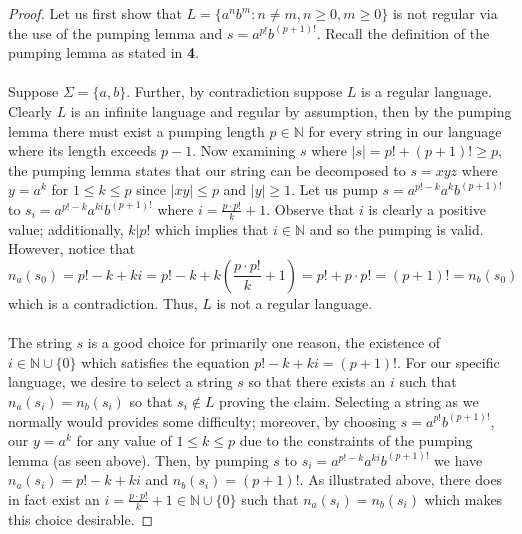 \documentclass[ 12pt ]{article}
\begin{document}
\begin{enumerate}
		\begin{proof}
			Let us first show that $L =  \{ a^n b^m : n \neq m, n \geq 0, m \geq 0 \}$ is not regular via the use of the pumping lemma and $s = a^{p!} b^{(p+1)!}$. Recall the definition
			of the pumping lemma as stated in \textbf{4}. \\ \\
			Suppose $\Sigma = \{ a, b \}$. Further, by contradiction suppose $L$ is a regular language. Clearly $L$ is an infinite language and regular by assumption, then by the pumping
			lemma there must exist a pumping length $p \in \mathbb{N}$ for every string in our language where its length exceeds $p-1$. Now examining $s$ where $|s| = p! + (p+1)! \geq p$,
			the pumping lemma states that our string can be decomposed to $s = xyz$ where $y = a^k$ for $1 \leq k \leq p$ since $|xy| \leq p$ and $|y| \geq 1$. Let us pump
			$s = a^{p! - k} a^k b^{(p+1)!}$ to $s_i = a^{p! - k} a^{ki} b^{(p+1)!}$ where $i = \frac{p \cdot p!}{k} + 1$. Observe that $i$ is clearly a positive value; additionally,
			$k | p!$ which implies that $i \in \mathbb{N}$ and so the pumping is valid. However, notice that $$n_a(s_0) = p! - k + ki = p! - k + k \left ( \frac{p \cdot p!}{k} + 1
			\right ) = p! + p \cdot p! = (p+1)! = n_b(s_0)$$ which is a contradiction. Thus, $L$ is not a regular language. \\ \\
			The string $s$ is a good choice for primarily one reason, the existence of $i \in \mathbb{N} \cup \{ 0 \}$ which satisfies the equation $p! - k + ki = (p+1)!$. For our
			specific language, we desire to select a string $s$ so that there exists an $i$ such that $n_a(s_i) = n_b(s_i)$ so that $s_i \notin L$ proving the claim. Selecting
			a string as we normally would provides some difficulty; moreover, by choosing $s = a^{p!} b^{(p+1)!}$, our $y = a^k$ for any value of $1 \leq k \leq p$ due to the constraints
			of the pumping lemma (as seen above). Then, by pumping $s$ to $s_i = a^{p! - k} a^{ki} b^{(p+1)!}$ we have $n_a(s_i) = p! - k + ki$ and $n_b(s_i) = (p+1)!$. As illustrated
			above, there does in fact exist an $i = \frac{p \cdot p!}{k} + 1 \in \mathbb{N} \cup \{ 0 \}$ such that $n_a(s_i) = n_b(s_i)$ which makes this choice desirable.
		\end{proof}
\end{enumerate}
\end{document}
